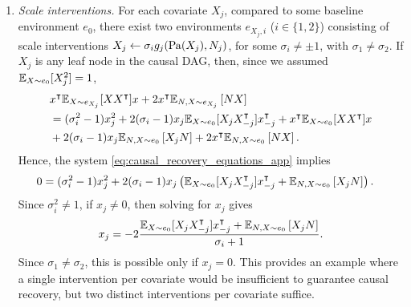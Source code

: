 \documentclass{article}
\begin{document}
\begin{enumerate}[itemsep=1em]
    \item \textit{Scale interventions.} For each covariate $X_j$, compared to some baseline environment $e_0$, there exist two environments $e_{X_j,i}$ ($i \in \{1,2\}$) consisting of scale interventions $X_j \leftarrow \sigma_i g_j(\mathrm{Pa}(X_j), N_j)$, for some $\sigma_i \neq \pm 1$, with $\sigma_1 \neq \sigma_2$. If $X_j$ is any leaf node in the causal DAG, then, since we assumed $\mathbb{E}_{X \sim e_0}[X_j^2] = 1$,
    \begin{align*}
        & x^\intercal \mathbb{E}_{X \sim e_{X_j}}[X X^\intercal] x
            + 2 x^\intercal \mathbb{E}_{N,X \sim e_{X_j}} \left[ N X \right] \\
        & = (\sigma_i^2 - 1) x_j^2
          + 2 (\sigma_i - 1) x_j \mathbb{E}_{X \sim e_0}[X_j X_{-j}^\intercal] x_{-j}^\intercal
          + x^\intercal \mathbb{E}_{X \sim e_0}[X X^\intercal] x \\
        & + 2 (\sigma_i - 1) x_j \mathbb{E}_{N,X \sim e_0} \left[ X_j N \right]
          + 2 x^\intercal \mathbb{E}_{N,X \sim e_0} \left[ N X \right].
    \end{align*}
    Hence, the system \eqref{eq:causal_recovery_equations_app} implies
    \begin{align*}
        0 & = (\sigma_i^2 - 1) x_j^2
          + 2 (\sigma_i - 1) x_j \left( \mathbb{E}_{X \sim e_0}[X_j X_{-j}^\intercal] x_{-j}^\intercal
          + \mathbb{E}_{N,X \sim e_0} \left[ X_j N \right] \right).
    \end{align*}
    Since $\sigma_i^2 \neq 1$, if $x_j \neq 0$, then solving for $x_j$ gives
    \[x_j = -2 \frac{\mathbb{E}_{X \sim e_0}[X_j X_{-j}^\intercal] x_{-j}^\intercal
        + \mathbb{E}_{N,X \sim e_0} \left[ X_j N \right]}{\sigma_i + 1}.\]
    Since $\sigma_1 \neq \sigma_2$, this is possible only if $x_j = 0$.
    This provides an example where a single intervention per covariate would be insufficient to guarantee causal recovery, but two distinct interventions per covariate suffice.
    \begin{figure}[tb]
    \centering
\end{figure}
\end{enumerate}
\end{document}
